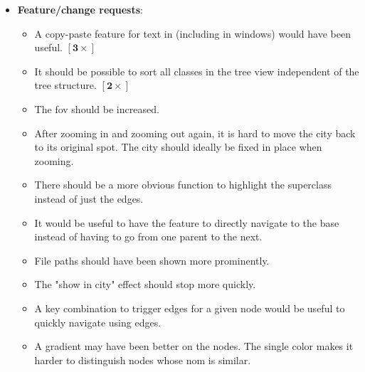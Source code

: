 \documentclass[../thesis]{subfiles}
\begin{document}
\begin{itemize}
	\item \textbf{Feature/change requests}:
	      \begin{itemize}
		      \item A copy-paste feature for text in \SEE{} (including in \glspl{window}) would have been useful. $\bm{[3\times]}$ \agree
		      \item It should be possible to sort all classes in the tree view independent of the tree structure. $\bm{[2\times]}$
		      \item The \gls{fov} should be increased.
		      \item After zooming in and zooming out again, it is hard to move the \gls{city} back to its original spot.
		            The \gls{city} should ideally be fixed in place when zooming. \agree{}
		      \item There should be a more obvious function to highlight the superclass instead of just the edges.
		      \item It would be useful to have the feature to directly navigate to the \gls{base} instead of having to go from one parent to the next.
		      \item File paths should have been shown more prominently.
		      \item The "show in city" effect should stop more quickly. \agree
		      \item A key combination to trigger edges for a given node would be useful to quickly navigate using edges.
		      \item A gradient may have been better on the nodes.
		            The single color makes it harder to distinguish nodes whose \gls{nom} is similar. \agree {}

\end{itemize}
\end{itemize}
\end{document}
